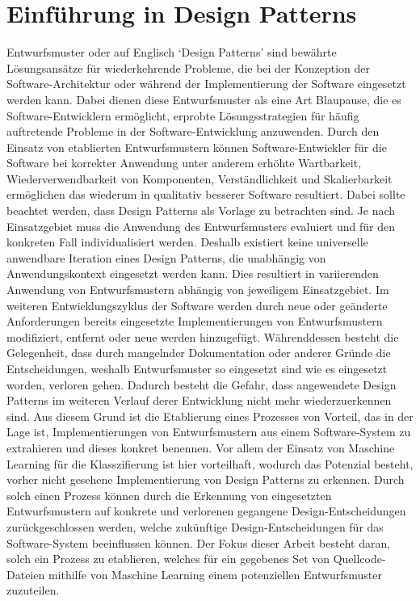 \section{Einführung in Design Patterns}

Entwurfsmuster oder auf Englisch `Design Patterns' sind bewährte Lösungsansätze für wiederkehrende Probleme, die bei der Konzeption der Software-Architektur oder während der Implementierung der Software
eingesetzt werden kann. Dabei dienen diese Entwurfsmuster als eine Art Blaupause, die es Software-Entwicklern ermöglicht, erprobte Lösungsstrategien für häufig auftretende Probleme in der Software-Entwicklung anzuwenden.
Durch den Einsatz von etablierten Entwurfsmustern können Software-Entwickler für die Software bei korrekter Anwendung unter anderem erhöhte Wartbarkeit, Wiederverwendbarkeit von Komponenten, Verständlichkeit und Skalierbarkeit ermöglichen das wiederum in qualitativ besserer Software resultiert.
Dabei sollte beachtet werden, dass Design Patterns als Vorlage zu betrachten sind. Je nach Einsatzgebiet muss die Anwendung des Entwurfsmusters evaluiert und für den konkreten Fall individualisiert werden.
Deshalb existiert keine universelle anwendbare Iteration eines Design Patterns, die unabhängig von Anwendungskontext eingesetzt werden kann. Dies resultiert in variierenden Anwendung von Entwurfsmustern abhängig von jeweiligem Einsatzgebiet.
Im weiteren Entwicklungszyklus der Software werden durch neue oder geänderte Anforderungen bereits eingesetzte Implementierungen von Entwurfsmustern modifiziert, entfernt oder neue werden hinzugefügt.
Währenddessen besteht die Gelegenheit, dass durch mangelnder Dokumentation oder anderer Gründe die Entscheidungen, weshalb Entwurfsmuster so eingesetzt sind wie es eingesetzt worden, verloren gehen.
Dadurch besteht die Gefahr, dass angewendete Design Patterns im weiteren Verlauf derer Entwicklung nicht mehr wiederzuerkennen sind. Aus diesem Grund ist die Etablierung eines Prozesses von Vorteil, das in der Lage ist,
Implementierungen von Entwurfsmustern aus einem Software-System zu extrahieren und dieses konkret benennen. Vor allem der Einsatz von Maschine Learning für die Klasszifierung ist hier vorteilhaft, wodurch das Potenzial besteht, vorher nicht gesehene Implementierung von Design Patterns zu erkennen.
Durch solch einen Prozess können durch die Erkennung von eingesetzten Entwurfsmustern auf konkrete und verlorenen gegangene Design-Entscheidungen zurückgeschlossen werden, welche zukünftige Design-Entscheidungen für das Software-System beeinflussen können. 
Der Fokus dieser Arbeit besteht daran, solch ein Prozess zu etablieren, welches für ein gegebenes Set von Quellcode-Dateien mithilfe von Maschine Learning einem potenziellen Entwurfsmuster zuzuteilen.  

